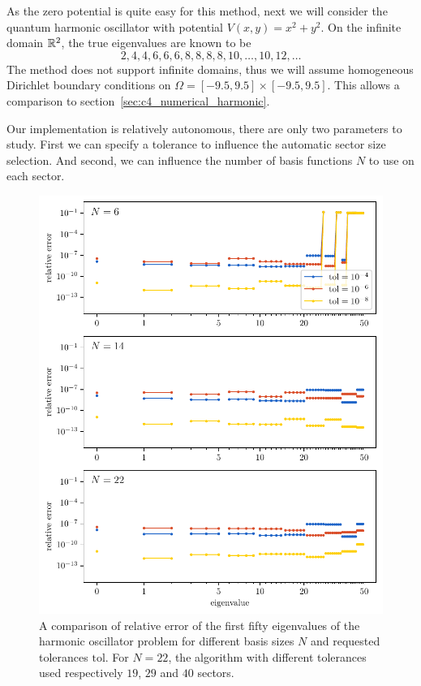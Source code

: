 As the zero potential is quite easy for this method, next we will consider the quantum harmonic oscillator with potential $V(x, y) = x^2 + y^2$. On the infinite domain $\mathbb{R}^2$, the true eigenvalues are known to be
$$
  2, 4, 4, 6, 6, 6, 8, 8, 8, 8, 10, \dots, 10, 12, \dots
$$
The method does not support infinite domains, thus we will assume homogeneous Dirichlet boundary conditions on $\Omega = [-9.5, 9.5] \times [-9.5, 9.5]$. This allows a comparison to section~\ref{sec:c4_numerical_harmonic}.

Our implementation is relatively autonomous, there are only two parameters to study. First we can specify a tolerance to influence the automatic sector size selection. And second, we can influence the number of basis functions $N$ to use on each sector.

\begin{figure}
  \begin{center}
    \includegraphics[width=\textwidth]{img/chapter3/experiments/harmonic_lobatto.pdf}
  \end{center}
  \caption{A comparison of relative error of the first fifty eigenvalues of the harmonic oscillator problem for different basis sizes $N$ and requested tolerances $\text{tol}$. For $N=22$, the algorithm with different tolerances used respectively $19$, $29$ and $40$ sectors.}\label{fig:c3_experiment_harmonic}
\end{figure}

